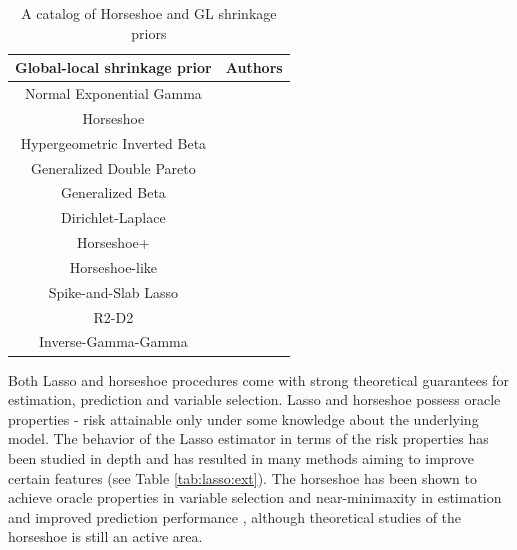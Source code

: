 \documentclass[sts,preprint]{imsart}
\begin{document}
\begin{table}[htbp]
  \centering
  \caption{A catalog of Horseshoe and GL shrinkage priors}
  \footnotesize{
    \begin{tabular}{|c|c|}
    \hline
    Global-local shrinkage prior  & Authors  \bigstrut\\
    \hline
    Normal Exponential Gamma & \citet{griffin2005alternative} \bigstrut[t]\\
    Horseshoe & \citet{carvalho2010horseshoe, carvalho2009handling} \\
    Hypergeometric Inverted Beta & \citet{polson2010large} \\
    Generalized Double Pareto & \citet{armagan2011generalized} \\
    Generalized Beta  & \citet{armagan2013generalized} \\
    Dirichlet-Laplace & \citet{bhattacharya2014dirichlet} \\
    Horseshoe+  & \citet{bhadra2015horseshoe+} \\
    Horseshoe-like & \citet{bhadra2017horseshoe} \\
    Spike-and-Slab Lasso & \citet{rovckova2016spike} \\
    R2-D2 & \citet{zhang2016high} \bigstrut[b]\\
		Inverse-Gamma-Gamma & \citet{bai2017inverse} \bigstrut[b]\\
    \hline
    \end{tabular}%
    }
  \label{tab:one-gps}%
\end{table}%


Both Lasso and horseshoe procedures come with strong theoretical guarantees for estimation, prediction and variable selection. Lasso and horseshoe possess oracle properties - risk attainable only under some knowledge about the underlying model. The behavior of the Lasso estimator in terms of the risk properties has been studied in depth and has resulted in many methods aiming to improve certain features (see Table \ref{tab:lasso:ext}). The horseshoe has been shown to achieve oracle properties in variable selection \citep{datta2013asymptotic} and near-minimaxity in estimation \citep{van2017adaptive} and improved prediction performance \citep{bhadra2016prediction}, although theoretical studies of the horseshoe is still an active area. 

\end{document}
